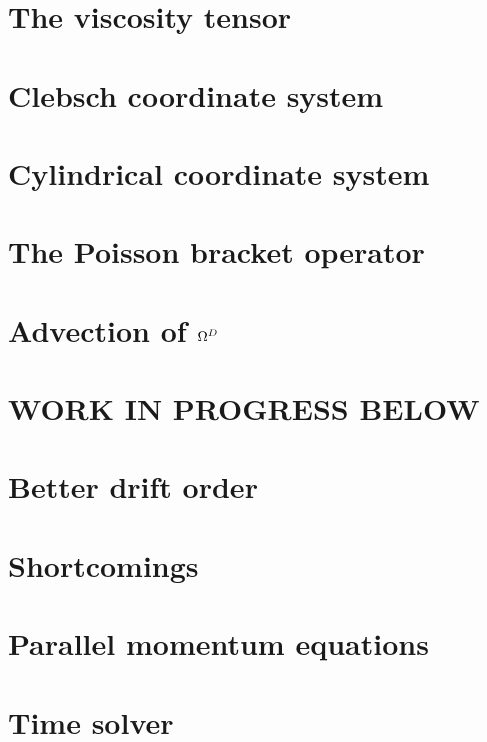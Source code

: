 \documentclass[12pt,a4paper,oneside,openright]{report} %
\begin{document}
\chapter{The viscosity tensor}
\label{app:piTensor}


\chapter{Clebsch coordinate system}
\label{app:Clebsch}


\chapter{Cylindrical coordinate system}
\label{app:cylcoord}


\chapter{The Poisson bracket operator}
\label{app:poisson}


\chapter{Advection of \texorpdfstring{$\Omega^D$}{OmegaD}}
\label{app:vortDAdv}


\chapter{WORK IN PROGRESS BELOW}

\chapter{Better drift order}
\label{app:betterDO}


\chapter{Shortcomings}
\label{app:shortcomings}


\chapter{Parallel momentum equations}
\label{app:parMom}


\chapter{Time solver}
\label{app:timeSolver}

\end{document}
